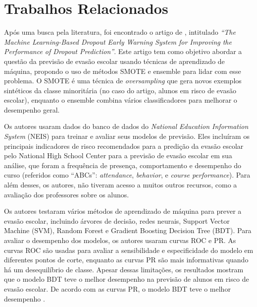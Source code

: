 \chapter{Trabalhos Relacionados}



Após uma busca pela literatura, foi encontrado o artigo de , intitulado \textit{``The Machine Learning-Based Dropout Early Warning System for Improving the Performance of Dropout Prediction''}. Este artigo tem como objetivo abordar a questão da previsão de evasão escolar usando técnicas de aprendizado de máquina, propondo o uso de métodos SMOTE e ensemble para lidar com esse problema. O SMOTE é uma técnica de \textit{oversampling} que gera novos exemplos sintéticos da classe minoritária (no caso do artigo, alunos em risco de evasão escolar), enquanto o ensemble combina vários classificadores para melhorar o desempenho geral. 

Os autores usaram dados do banco de dados do \textit{National Education Information System} (NEIS) para treinar e avaliar seus modelos de previsão. Eles incluíram os principais indicadores de risco recomendados para a predição da evasão escolar pelo National High School Center para a previsão de evasão escolar em sua análise, que foram a frequência de presença, comportamento e desempenho do curso (referidos como ``ABCs'': \textit{attendance}, \textit{behavior}, e \textit{course performance}). Para além desses, os autores, não tiveram acesso a muitos outros recursos, como a avaliação dos professores sobre os alunos.

Os autores testaram vários métodos de aprendizado de máquina para prever a evasão escolar, incluindo árvores de decisão, redes neurais, Support Vector Machine (SVM), Random Forest e Gradient Boosting Decision Tree (BDT). Para avaliar o desempenho dos modelos, os autores usaram curvas ROC e PR. As curvas ROC são usadas para avaliar a sensibilidade e especificidade do modelo em diferentes pontos de corte, enquanto as curvas PR são mais informativas quando há um desequilíbrio de classe. Apesar dessas limitações, os resultados mostram que o modelo BDT teve o melhor desempenho na previsão de alunos em risco de evasão escolar. De acordo com as curvas PR, o modelo BDT teve o melhor desempenho \cite{Lee2019}.

